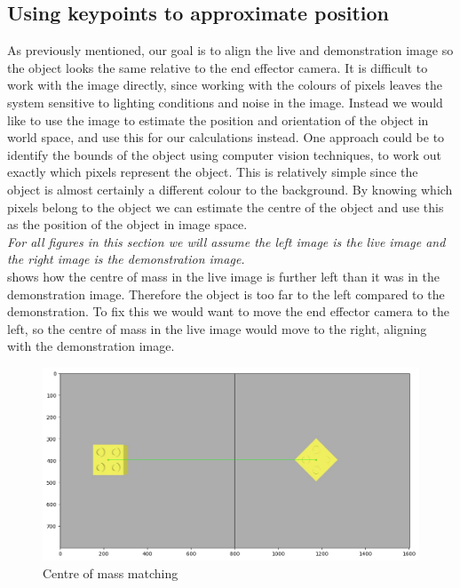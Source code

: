 \subsection{Using keypoints to approximate position}
\label{subsec:keypoints}
As previously mentioned, our goal is to align the live and demonstration image so the object looks the same relative to the end effector camera. It is difficult to work with the image directly, since working with the colours of pixels leaves the system sensitive to lighting conditions and noise in the image. Instead we would like to use the image to estimate the position and orientation of the object in world space, and use this for our calculations instead. One approach could be to identify the bounds of the object using computer vision techniques, to work out exactly which pixels represent the object. This is relatively simple since the object is almost certainly a different colour to the background. By knowing which pixels belong to the object we can estimate the centre of the object and use this as the position of the object in image space.\\

\textit{For all figures in this section we will assume the left image is the live image and the right image is the demonstration image.}\\

 shows how the centre of mass in the live image is further left than it was in the demonstration image. Therefore the object is too far to the left compared to the demonstration. To fix this we would want to move the end effector camera to the left, so the centre of mass in the live image would move to the right, aligning with the demonstration image.

\begin{figure}[h]
    \centering
    \includegraphics[width=\textwidth]{figures/ideal_centre-of-mass.png}
    \caption{Centre of mass matching}
    \label{fig:centre-of-mass}
\end{figure}

